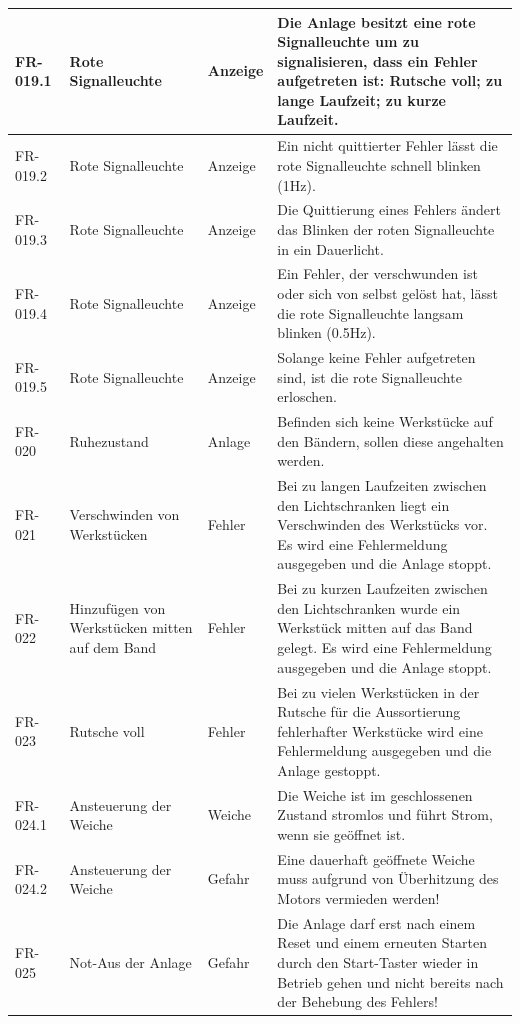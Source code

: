 \documentclass[oneside,a4paper,titlepage]{scrartcl} %
\begin{document}
\begin{small}
\begin{longtable}{|C{2cm}|L{4cm}|C{1.5cm}|L{5.5cm}|}
  \hline
  FR-019.1 & Rote Signalleuchte & Anzeige & Die Anlage besitzt eine rote Signalleuchte um zu signalisieren, dass ein Fehler aufgetreten ist: Rutsche voll; zu lange Laufzeit; zu kurze Laufzeit.\\
  \hline
  FR-019.2 & Rote Signalleuchte & Anzeige & Ein nicht quittierter Fehler lässt die rote Signalleuchte schnell blinken (1Hz).\\
  \hline
  FR-019.3 & Rote Signalleuchte & Anzeige & Die Quittierung eines Fehlers ändert das Blinken der roten Signalleuchte in ein Dauerlicht.\\
  \hline
  FR-019.4 & Rote Signalleuchte & Anzeige & Ein Fehler, der verschwunden ist oder sich von selbst gelöst hat, lässt die rote Signalleuchte langsam blinken (0.5Hz).\\
  \hline
  FR-019.5 & Rote Signalleuchte & Anzeige & Solange keine Fehler aufgetreten sind, ist die rote Signalleuchte erloschen.\\
  \hline
   FR-020 & Ruhezustand & Anlage & Befinden sich keine Werkstücke auf den Bändern, sollen diese angehalten werden.\\
  \hline
  FR-021 & Verschwinden von Werkstücken & Fehler & Bei zu langen Laufzeiten zwischen den Lichtschranken liegt ein Verschwinden des Werkstücks vor. Es wird eine Fehlermeldung ausgegeben und die Anlage stoppt.\\
  \hline
   FR-022 & Hinzufügen von Werkstücken mitten auf dem Band & Fehler & Bei zu kurzen Laufzeiten zwischen den Lichtschranken wurde ein Werkstück mitten auf das Band gelegt. Es wird eine Fehlermeldung ausgegeben und die Anlage stoppt.\\
  \hline
  FR-023 & Rutsche voll & Fehler & Bei zu vielen Werkstücken in der Rutsche für die Aussortierung fehlerhafter Werkstücke wird eine Fehlermeldung ausgegeben und die Anlage gestoppt.\\
  \hline
   FR-024.1 & Ansteuerung der Weiche & Weiche & Die Weiche ist im geschlossenen Zustand stromlos und führt Strom, wenn sie geöffnet ist.\\
  \hline
   FR-024.2 & Ansteuerung der Weiche & Gefahr & Eine dauerhaft geöffnete Weiche muss aufgrund von Überhitzung des Motors vermieden werden!\\
  \hline
  FR-025 & Not-Aus der Anlage & Gefahr & Die Anlage darf erst nach einem Reset und einem erneuten Starten durch den Start-Taster wieder in Betrieb gehen und nicht bereits nach der Behebung des Fehlers!\\

\end{longtable}
\end{small}
\end{document}
